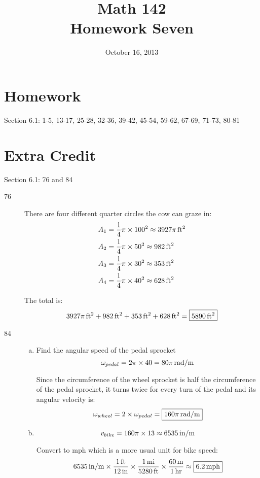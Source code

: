 \documentclass{exam}
\author{}
\date{October 16, 2013}
\title{Math 142 \\ Homework Seven}
\begin{document}
  \maketitle

  \section{Homework}
  Section 6.1: 1-5, 13-17, 25-28, 32-36, 39-42, 45-54, 59-62, 67-69, 71-73, 80-81

  \section{Extra Credit}
  Section 6.1: 76 and 84

  \ifprintanswers

    \begin{description}
      \item[76]
        There are four different quarter circles the cow can graze in:
        \begin{align*}
          A_1 &= \frac{1}{4} \pi \times 100^2 \approx \unit[3927 \pi]{ft^2} \\
          A_2 &= \frac{1}{4} \pi \times 50^2 \approx \unit[982]{ft^2} \\
          A_3 &= \frac{1}{4} \pi \times 30^2 \approx \unit[353]{ft^2} \\
          A_4 &= \frac{1}{4} \pi \times 40^2 \approx \unit[628]{ft^2} \\
        \end{align*}

        The total is:
        \[
          \unit[3927 \pi]{ft^2} + \unit[982]{ft^2} + \unit[353]{ft^2} + \unit[628]{ft^2} = \boxed{ \unit[5890]{ft^2} }
        \]
        
      \item[84]
        \begin{enumerate}[(a)]

          \item 
            Find the angular speed of the pedal sprocket
            \[
              \omega_{pedal} = 2 \pi \times 40 = \unit[80 \pi]{rad/m}
            \]

            Since the circumference of the wheel sprocket is half the circumference of the pedal sprocket, it turns
            twice for every turn of the pedal and its angular velocity is:
            \[
              \omega_{wheel} = 2 \times \omega_{pedal} = \boxed{ \unit[160 \pi]{rad/m} } 
            \]

          \item 
            \[
              v_{bike} = 160 \pi \times 13 \approx \unit[ 6535 ]{in/m}
            \]

            Convert to mph which is a more usual unit for bike speed:
            \[
              \unit[ 6535 ]{in/m} \times \frac{\unit[1]{ft}}{\unit[12]{in}} \times \frac{\unit[1]{mi}}{\unit[5280]{ft}}
              \times \frac{\unit[60]{m}}{\unit[1]{hr}} \approx \boxed{ \unit[6.2]{mph} }
            \]


        \end{enumerate}
    \end{description}
\end{document}
